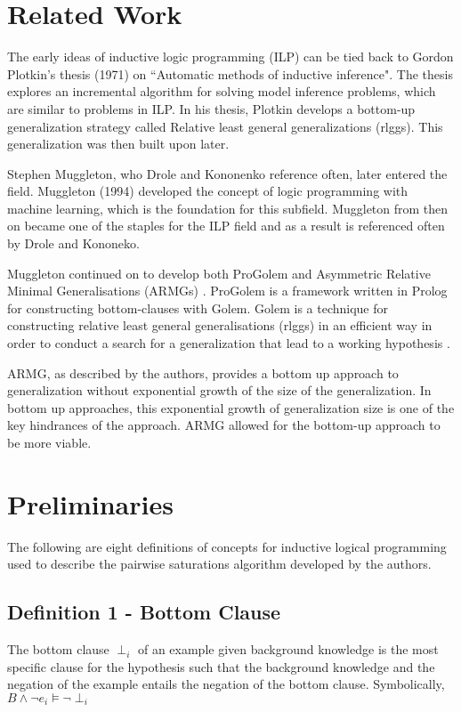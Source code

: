 \documentclass[jair,twoside,11pt,theapa]{article}
\begin{document}
\section{Related Work}
\label{relatedwork}
The early ideas of inductive logic programming (ILP) can be tied back to Gordon Plotkin's thesis (1971) on ``Automatic methods of inductive inference". The thesis explores an incremental algorithm for solving model inference problems, which are similar to problems in ILP. In his thesis, Plotkin develops a bottom-up generalization strategy called Relative least general generalizations (rlggs). This generalization was then built upon later.

Stephen Muggleton, who Drole and Kononenko reference often, later entered the field. Muggleton (1994) developed the concept of logic programming with machine learning, which is the foundation for this subfield. Muggleton from then on became one of the staples for the ILP field and as a result is referenced often by Drole and Kononeko. 

Muggleton continued on to develop both ProGolem and Asymmetric Relative Minimal Generalisations (ARMGs) \cite{ProGolem}. ProGolem is a framework written in Prolog for constructing bottom-clauses with Golem. Golem is a technique for constructing relative least general generalisations (rlggs) in an efficient way in order to conduct a search for a generalization that lead to a working hypothesis \cite{Golem}. 

ARMG, as described by the authors, provides a bottom up approach to generalization without exponential growth of the size of the generalization. In bottom up approaches, this exponential growth of generalization size is one of the key hindrances of the approach. ARMG allowed for the bottom-up approach to be more viable. 




\section{Preliminaries}
\label{preliminaries}
The following are eight definitions of concepts for inductive logical programming used to describe the pairwise saturations algorithm developed by the authors.

\subsection{Definition 1 - Bottom Clause}
The bottom clause $\perp_i$ of an example given background knowledge is the most specific clause for the hypothesis such that the background knowledge and the negation of the example entails the negation of the bottom clause. Symbolically, $B \wedge \neg e_i \vDash \neg \perp_i$
\end{document}
